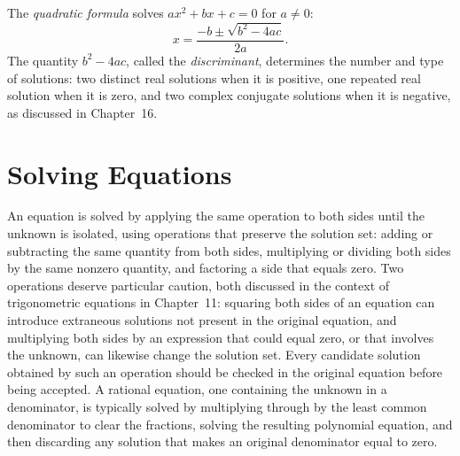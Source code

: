 The \emph{quadratic formula} solves $ax^2+bx+c=0$ for $a \neq 0$:
\[
x = \frac{-b \pm \sqrt{b^2-4ac}}{2a}.
\]
The quantity $b^2-4ac$, called the \emph{discriminant}, determines the
number and type of solutions: two distinct real solutions when it is
positive, one repeated real solution when it is zero, and two complex
conjugate solutions when it is negative, as discussed in Chapter~16.

\section{Solving Equations}

An equation is solved by applying the same operation to both sides until
the unknown is isolated, using operations that preserve the solution set:
adding or subtracting the same quantity from both sides, multiplying or
dividing both sides by the same nonzero quantity, and factoring a side
that equals zero. Two operations deserve particular caution, both
discussed in the context of trigonometric equations in Chapter~11:
squaring both sides of an equation can introduce extraneous solutions
not present in the original equation, and multiplying both sides by an
expression that could equal zero, or that involves the unknown, can
likewise change the solution set. Every candidate solution obtained by
such an operation should be checked in the original equation before being
accepted. A rational equation, one containing the unknown in a
denominator, is typically solved by multiplying through by the least
common denominator to clear the fractions, solving the resulting
polynomial equation, and then discarding any solution that makes an
original denominator equal to zero.
